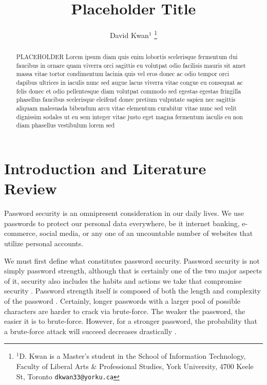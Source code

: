 \documentclass[letterpaper, 10 pt, conference]{ieeeconf}  %
\title{\LARGE \bf
Placeholder Title
}
\author{David Kwan$^{1}$%
\thanks{$^{1}$D. Kwan is a Master's student in the School of Information Technology, Faculty of Liberal Arts \& Professional Studies, York University, 4700 Keele St, Toronto
        {\tt\small dkwan33@yorku.ca}}%
}
\begin{document}
\maketitle
\thispagestyle{empty}
\pagestyle{empty}


\begin{abstract}

PLACEHOLDER Lorem ipsum diam quis enim lobortis scelerisque fermentum dui faucibus in ornare quam viverra orci sagittis eu volutpat odio facilisis mauris sit amet massa vitae tortor condimentum lacinia quis vel eros donec ac odio tempor orci dapibus ultrices in iaculis nunc sed augue lacus viverra vitae congue eu consequat ac felis donec et odio pellentesque diam volutpat commodo sed egestas egestas fringilla phasellus faucibus scelerisque eleifend donec pretium vulputate sapien nec sagittis aliquam malesuada bibendum arcu vitae elementum curabitur vitae nunc sed velit dignissim sodales ut eu sem integer vitae justo eget magna fermentum iaculis eu non diam phasellus vestibulum lorem sed

\end{abstract}


\section{Introduction and Literature Review}

Password security is an omnipresent consideration in our daily lives. We use passwords to protect our personal data everywhere, be it internet banking, e-commerce, social media, or any one of an uncountable number of websites that utilize personal accounts. 

We must first define what constitutes password security. Password security is not simply password strength, although that is certainly one of the two major aspects of it, security also includes the habits and actions we take that compromise security \cite{Dhamija2000}. Password strength itself is composed of both the length and complexity of the password \cite{Morris1979}. Certainly, longer passwords with a larger pool of possible characters are harder to crack via brute-force. The weaker the password, the easier it is to brute-force. However, for a stronger password, the probability that a brute-force attack will succeed decreases drastically \cite{DellAmico2010}.
\end{document}
